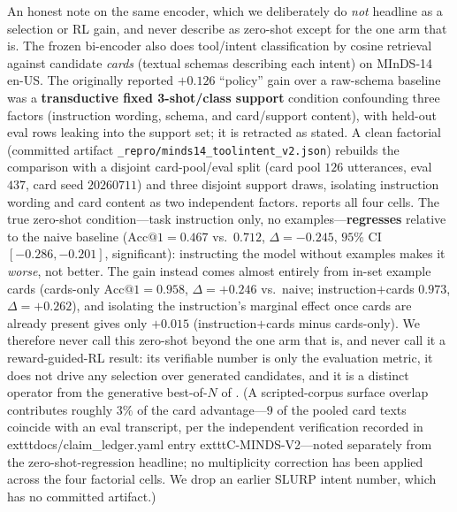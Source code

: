 An honest note on the same encoder, which we deliberately do \emph{not} headline as a selection or RL gain, and never describe as zero-shot except for the one arm that is. The frozen bi-encoder also does tool/intent classification by cosine retrieval against candidate \emph{cards} (textual schemas describing each intent) on MInDS-14 en-US. The originally reported $+0.126$ ``policy'' gain over a raw-schema baseline was a \textbf{transductive fixed 3-shot/class support} condition confounding three factors (instruction wording, schema, and card/support content), with held-out eval rows leaking into the support set; it is retracted as stated. A clean factorial (committed artifact \texttt{\_repro/minds14\_toolintent\_v2.json}) rebuilds the comparison with a disjoint card-pool/eval split (card pool $126$ utterances, eval $437$, card seed $20260711$) and three disjoint support draws, isolating instruction wording and card content as two independent factors.  reports all four cells. The true zero-shot condition---task instruction only, no examples---\textbf{regresses} relative to the naive baseline ($\mathrm{Acc@1}=0.467$ vs.\ $0.712$, $\Delta=-0.245$, $95\%$ CI $[-0.286,-0.201]$, significant): instructing the model without examples makes it \emph{worse}, not better. The gain instead comes almost entirely from in-set example cards (cards-only $\mathrm{Acc@1}=0.958$, $\Delta=+0.246$ vs.\ naive; instruction$+$cards $0.973$, $\Delta=+0.262$), and isolating the instruction's marginal effect once cards are already present gives only $+0.015$ (instruction$+$cards minus cards-only). We therefore never call this zero-shot beyond the one arm that is, and never call it a reward-guided-RL result: its verifiable number is only the evaluation metric, it does not drive any selection over generated candidates, and it is a distinct operator from the generative best-of-$N$ of . (A scripted-corpus surface overlap contributes roughly $3\%$ of the card advantage---$9$ of the pooled card texts coincide with an eval transcript, per the independent verification recorded in 	exttt{docs/claim\_ledger.yaml} entry 	exttt{C-MINDS-V2}---noted separately from the zero-shot-regression headline; no multiplicity correction has been applied across the four factorial cells. We drop an earlier SLURP intent number, which has no committed artifact.)

